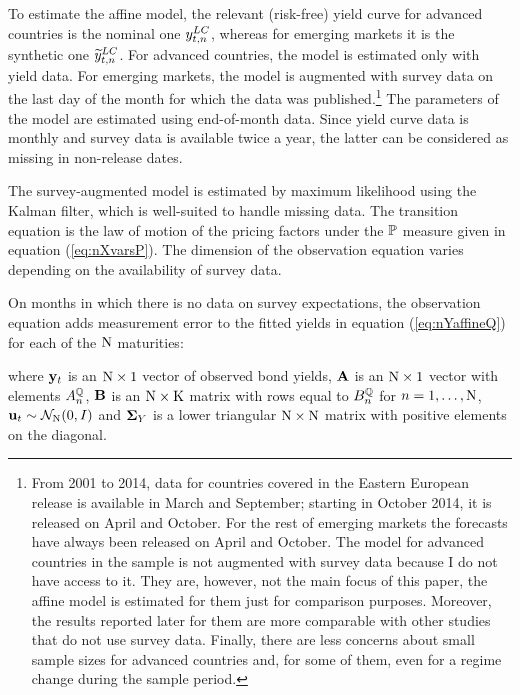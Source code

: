 {To estimate the affine model, the relevant (risk-free) yield curve for advanced countries is the nominal one \(y_{t,n} ^{LC}\), whereas for emerging markets it is the synthetic one \(\widetilde{y}_{t,n} ^{LC}\).
For advanced countries, the model is estimated only with yield data. 
For emerging markets, the model is augmented with survey data on the last day of the month for which the data was published.\footnote{ From 2001 to 2014, data for countries covered in the Eastern European release is available in March and September; starting in October 2014, it is released on April and October. For the rest of emerging markets the forecasts have always been released on April and October. The model for advanced countries in the sample is not augmented with survey data because I do not have access to it. They are, however, not the main focus of this paper, the affine model is estimated for them just for comparison purposes. Moreover, the results reported later for them are more comparable with other studies that do not use survey data. Finally, there are less concerns about small sample sizes for advanced countries and, for some of them, even for a regime change during the sample period.}
The parameters of the model are estimated using end-of-month data.
Since yield curve data is monthly and survey data is available twice a year, the latter can be considered as missing in non-release dates.

The survey-augmented model is estimated by maximum likelihood using the Kalman filter, which is well-suited to handle missing data. 
The transition equation is the law of motion of the pricing factors under the \(\mathbb{P}\) measure given in equation (\ref{eq:nXvarsP}).
The dimension of the observation equation varies depending on the availability of survey data. 

On months in which there is no data on survey expectations, the observation equation adds measurement error to the fitted yields in equation (\ref{eq:nYaffineQ}) for each of the \(\mathrm{N}\) maturities:
	
\noindent where \(\mathbf{y}_{t}\) is an \(\mathrm{N} \times 1\) vector of observed bond yields, \(\mathbf{A}\) is an \(\mathrm{N} \times 1\) vector with elements \(A_{n}^{\mathbb{Q}}\), \(\mathbf{B}\) is an \(\mathrm{N} \times \mathrm{K}\) matrix with rows equal to \(B_{n}^{\mathbb{Q}}\) for \(n = 1, \ldots, \mathrm{N}\), \(\mathbf{u}_{t} \sim \mathcal{N}_{\mathrm{N}} (0,I) \) and \(\mathbf{\mathbf{\Sigma}}_{Y}\) is a lower triangular \(\mathrm{N} \times \mathrm{N}\) matrix with positive elements on the diagonal.

}
